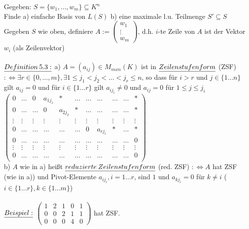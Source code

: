 \documentclass[fleqn, a4paper, 11pt]{article}
\begin{document}
Gegeben: $S=\{w_1 ,...,w_m\}\subseteq K^n$\\
Finde a) \dq einfache Basis \dq von $L(S)$  b) eine maximale l.u. Teilmenge $S'\subseteq S$\\
Gegeben $S$ wie oben, definiere $A:=\begin{pmatrix}
	w_1\\
	\vdots\\
	w_m
\end{pmatrix}$, d.h. $i$-te Zeile von $A$ ist der Vektor $w_i$ (als Zeilenvektor)\\
\\
$\uline{Definition\:5.3:}$ a) $A=(a_{ij})\in M_{mxn}(K)$ ist in $\uline{Zeilenstufenform}$ (ZSF) $:\Leftrightarrow \exists r\in\{0,...,m\},\exists 1\leq j_1 < j_2 < \dots < j_r \leq n$, so dass f\"ur $i>r$ und $j\in\{1...n\}$ gilt $a_{ij}=0$ und f\"ur $i\in\{1...r\}$ gilt $a_{ij_i}\neq 0$ und $a_{ij}=0$ f\"ur $1\leq j\leq j_i$\\
$\begin{pmatrix}
	0 & \dots & 0 & a_{1j_1} & \ast & \dots & \dots & \dots & \dots & \dots & \ast \\
	0 & \dots & \dots & 0 & a_{2j_2} & \ast & \dots & \dots & \dots & \dots & \ast \\
	\vdots & \vdots & \vdots & \vdots & \vdots & \vdots & \vdots & \vdots & \vdots & \vdots & \vdots\\
	0 & \dots & \dots & \dots & \dots & \dots & 0 & a_{rj_r} & \ast & \dots & \ast \\
	0 & \dots & \dots & \dots & \dots & \dots & \dots & \dots & \dots & \dots & 0 \\
	\vdots & \vdots & \vdots & \vdots & \vdots & \vdots & \vdots & \vdots & \vdots & \vdots & \vdots\\
	0 & \dots & \dots & \dots & \dots & \dots & \dots & \dots & \dots & \dots & 0 \\
\end{pmatrix}$\\
b) $A$ wie in a) hei\ss{}t $\uline{reduzierte\:Zeilenstufenform}$ (red. ZSF) $:\Leftrightarrow A$ hat ZSF (wie in a)) und Pivot-Elemente $a_{ij_i}, i=1...r$, sind $1$ und $a_{kj_i}=0$ f\"ur $k\neq i$ ($i\in\{1...r\}, k\in\{1...m\}$)\\
\\
$\uline{Beispiel:}$ $\begin{pmatrix}
	1 & 2 & 1 & 0 & 1\\
	0 & 0 & 2 & 1 & 1\\
	0 & 0 & 0 & 4 & 0
\end{pmatrix}$ hat ZSF.
\end{document}
